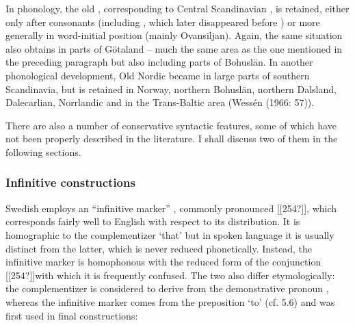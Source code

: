 In phonology, the old , corresponding to Central Scandinavian , is retained, either only after consonants (including , which later disappeared before ) or more generally in word-initial position (mainly Ovansiljan). Again, the same situation also obtains in parts of Götaland – much the same area as the one mentioned in the preceding paragraph but also including parts of Bohuslän. In another phonological development, Old Nordic  became in large parts of southern Scandinavia, but is retained in Norway, northern Bohuslän, northern Dalsland, Dalecarlian, Norrlandic and in the Trans-Baltic area (Wessén (1966: 57)).

There are also a number of conservative syntactic features, some of which have not been properly described in the literature. I shall discuss two of them in the following sections.

\subsubsection[Infinitive constructions]{\rmfamily Infinitive constructions}
\label{bkm:Ref218337377}%
Swedish employs an “infinitive marker” , commonly pronounced [[254?]], which corresponds fairly well to English with respect to its distribution. It is homographic to the complementizer  ‘that’ but in spoken language it is usually distinct from the latter, which is never reduced phonetically. Instead, the infinitive marker is homophonous with the reduced form of the conjunction [[254?]]\textstyleLinguisticExample{, }with which it is frequently confused. The two  also differ etymologically: the complementizer is considered to derive from the demonstrative pronoun , whereas the infinitive marker comes from the preposition  ‘to’ (cf. 5.6) and was first used in final constructions: 

